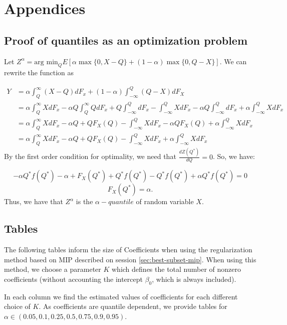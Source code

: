 \section{Appendices}
\label{appendice}

\subsection{Proof of quantiles as an optimization problem}
\label{sec:quantile-proof}
Let $Z^{\alpha}=\mbox{arg min}_{Q}E[\alpha\max\{0,X-Q\}+(1-\alpha)\max\{0,Q-X\}].$
We can rewrite the function as

\[
\begin{aligned}Y & =\alpha\int_{Q}^{\infty}(X-Q)dF_{x}+(1-\alpha)\int_{-\infty}^{Q}(Q-X)dF_{X}\\
& =\alpha\int_{Q}^{\infty}XdF_{x}-\alpha Q\int_{Q}^{\infty}QdF_{x}+Q\int_{-\infty}^{Q}dF_{x}-\int_{-\infty}^{Q}XdF_{x}-\alpha Q\int_{-\infty}^{Q}dF_{x}+\alpha\int_{-\infty}^{Q}XdF_{x}\\
& =\alpha\int_{Q}^{\infty}XdF_{x}-\alpha Q+QF_{X}(Q)-\int_{-\infty}^{Q}XdF_{x}-\alpha QF_{X}(Q)+\alpha\int_{-\infty}^{Q}XdF_{x}\\
& =\alpha\int_{Q}^{\infty}XdF_{x}-\alpha Q+QF_{X}(Q)-\int_{-\infty}^{Q}XdF_{x}+\alpha\int_{-\infty}^{Q}XdF_{x}
\end{aligned}
\]
By the first order condition for optimality, we need that $\frac{dZ(Q^{*})}{dQ}=0$.
So, we have:

\[
-\alpha Q^{*}f(Q^{*})-\alpha+F_{X}(Q^{*})+Q^{*}f(Q^{*})-Q^{*}f(Q^{*})+\alpha Q^{*}f(Q^{*})=0
\]
\[
F_{X}(Q^{*})=\alpha.
\]
Thus, we have that $Z^\alpha$ is the $\alpha-quantile$ of random variable $X$.

\subsection{Tables}

The following tables inform the size of Coefficients when using the regularization method based on MIP described on session \ref{sec:best-subset-mip}. When using this method, we choose a parameter $K$ which defines the total number of nonzero coefficients (without accounting the intercept $\beta_0$, which is always included). 

In each column we find the estimated values of coefficients for each different choice of $K$. As coefficients are quantile dependent, we provide tables for $\alpha \in (0.05, 0.1, 0.25, 0.5, 0.75, 0.9, 0.95)$.









